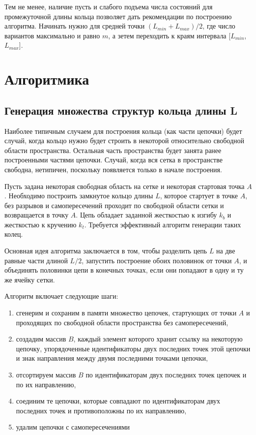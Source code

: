 \documentclass[tikz,a4paper]{scrartcl} %
\begin{document}
Тем не менее, наличие пусть и слабого подъема числа состояний для промежуточной длины кольца позволяет дать рекомендации по построению алгоритма. Начинать нужно для средней точки $(L_{min} + L_{max})/2$, где число вариантов максимально и равно $m$, а зетем переходить к краям интервала [$L_{min}$, $L_{max}$].

\section*{Алгоритмика}
\subsection*{Генерация множества структур кольца длины L}
Наиболее типичным случаем для построения кольца (как части цепочки) будет случай, когда кольцо нужно будет строить в некоторой относительно свободной области пространства. Остальная часть пространства будет занята ранее построенными частями цепочки. Случай, когда вся сетка в пространстве свободна, нетипичен, поскольку появляется только в начале построения.

Пусть задана некоторая свободная область на сетке и некоторая стартовая точка $A$. Необходимо построить замкнутое кольцо длины $L$, которое стартует в точке $A$, без разрывов и самопересечений проходит по свободной области сетки и возвращается в точку $A$. Цепь обладает заданной жесткостью к изгибу $k_b$ и жесткостью к кручению $k_t$. Требуется эффективный алгоритм генерации таких колец.

Основная идея алгоритма заключается в том, чтобы разделить цепь $L$ на две равные части длиной $L/2$, запустить построение обоих половинок от точки $A$, и объединять половинки цепи в конечных точках, если они попадают в одну и ту же ячейку сетки.

Алгоритм включает следующие шаги:
\begin{enumerate}
\item сгенерим и сохраним в памяти множество цепочек, стартующих от точки $A$ и проходящих по свободной области пространства без самопересечений,
\item создадим массив $B$, каждый элемент которого хранит ссылку на некоторую цепочку, упорядоченные идентификаторы двух последних точек этой цепочки и знак направления между двумя последними точками цепочки,
\item отсортируем массив $B$ по идентификаторам двух последних точек цепочек и по их направлению,
\item соединим те цепочки, которые совпадают по идентификаторам двух последних точек и противоположны по их направлению,
\item удалим цепочки с самопересечениями
\end{enumerate}
\end{document}
